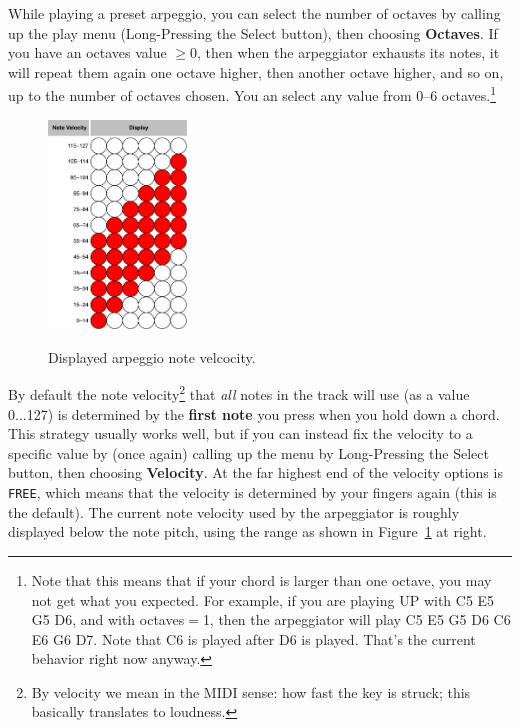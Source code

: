 \documentclass{article}
\begin{document}
While playing a preset arpeggio, you can select the number of octaves by calling up the play menu (Long-Pressing the Select button), then choosing {\bf Octaves}.  If you have an octaves value \(\geq 0\), then when the arpeggiator exhausts its notes, it will repeat them again one octave higher, then another octave higher, and so on, up to the number of octaves chosen. You an select any value from 0--6 octaves.\footnote{Note that this means that if your chord is larger than one octave, you may not get what you expected.  For example, if you are playing UP with C5 E5 G5 D6, and with octaves\(=\)1, then the arpeggiator will play C5 E5 G5 D6 C6 E6 G6 D7.  Note that C6 is played after D6 is played.  That's the current behavior right now anyway.}

\begin{figure}
\begin{center}
\vspace{-2em}
\includegraphics[width=1.45in]{arpvelocity}\\
\caption{Displayed arpeggio note velcocity.}
\end{center}
\vspace{-2em}
\label{arpvelocity}
\end{figure}

By default the note velocity\footnote{By velocity we mean in the MIDI sense: how fast the key is struck; this basically translates to loudness.} that {\it all} notes in the track will use (as a value 0...127) is determined by the {\bf first note} you press when you hold down a chord.  This strategy usually works well, but if you can instead fix the velocity to a specific value by (once again) calling up the menu by Long-Pressing the Select button, then choosing {\bf Velocity}.  At the far highest end of the velocity options is \texttt{FREE}, which means that the velocity is determined by your fingers again (this is the default). The current note velocity used by the arpeggiator is roughly displayed below the note pitch, using the range as shown in Figure~\ref{arpvelocity} at right.
\end{document}
